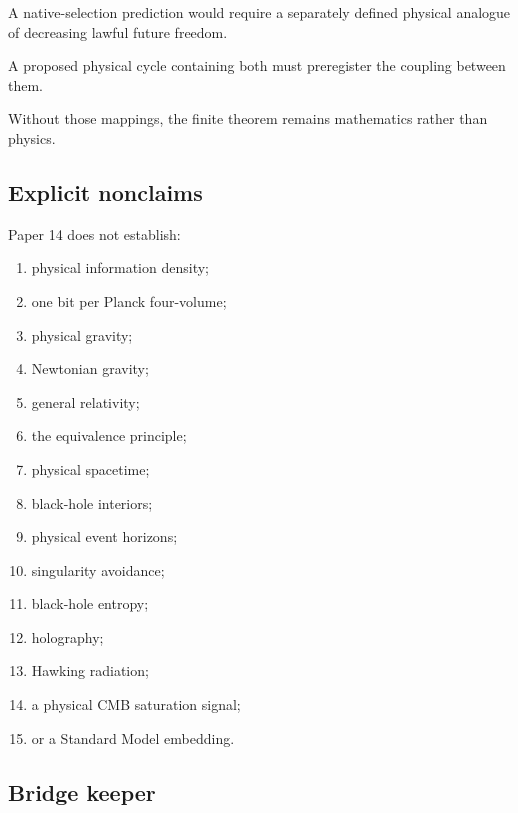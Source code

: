 A native-selection prediction would require a separately defined
physical analogue of decreasing lawful future freedom.

A proposed physical cycle containing both must preregister the
coupling between them.

Without those mappings, the finite theorem remains mathematics rather
than physics.

\subsection{Explicit nonclaims}

Paper 14 does not establish:

\begin{enumerate}[label=(\roman*)]

\item physical information density;

\item one bit per Planck four-volume;

\item physical gravity;

\item Newtonian gravity;

\item general relativity;

\item the equivalence principle;

\item physical spacetime;

\item black-hole interiors;

\item physical event horizons;

\item singularity avoidance;

\item black-hole entropy;

\item holography;

\item Hawking radiation;

\item a physical CMB saturation signal;

\item or a Standard Model embedding.

\end{enumerate}

\subsection{Bridge keeper}


